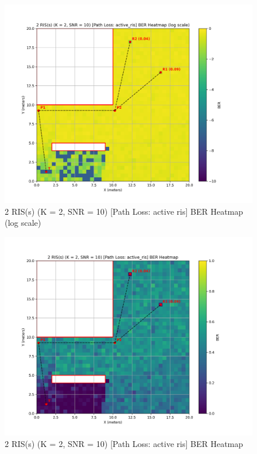 \begin{figure}[H]
  \centering
  \includegraphics[width=0.8\linewidth]{imgs/heatmap-simulations/2 RIS(s) (K = 2, SNR = 10) [Path Loss_ active_ris] BER Heatmap (log scale).png}
  \caption{2 RIS(s) (K = 2, SNR = 10) [Path Loss: active ris] BER Heatmap (log scale)}
\end{figure}

\begin{figure}[H]
  \centering
  \includegraphics[width=0.8\linewidth]{imgs/heatmap-simulations/2 RIS(s) (K = 2, SNR = 10) [Path Loss_ active_ris] BER Heatmap.png}
  \caption{2 RIS(s) (K = 2, SNR = 10) [Path Loss: active ris] BER Heatmap}
\end{figure}

